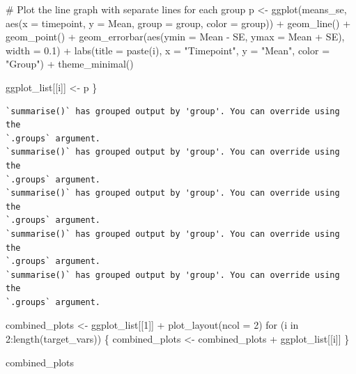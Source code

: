 \documentclass[
  letterpaper,
  DIV=11,
  numbers=noendperiod]{scrreprt}
\newenvironment{Shaded}{\begin{snugshade}}{\end{snugshade}}
\newcommand{\AttributeTok}[1]{\textcolor[rgb]{0.40,0.45,0.13}{#1}}
\newcommand{\CommentTok}[1]{\textcolor[rgb]{0.37,0.37,0.37}{#1}}
\newcommand{\ControlFlowTok}[1]{\textcolor[rgb]{0.00,0.23,0.31}{#1}}
\newcommand{\DecValTok}[1]{\textcolor[rgb]{0.68,0.00,0.00}{#1}}
\newcommand{\FloatTok}[1]{\textcolor[rgb]{0.68,0.00,0.00}{#1}}
\newcommand{\FunctionTok}[1]{\textcolor[rgb]{0.28,0.35,0.67}{#1}}
\newcommand{\NormalTok}[1]{\textcolor[rgb]{0.00,0.23,0.31}{#1}}
\newcommand{\OtherTok}[1]{\textcolor[rgb]{0.00,0.23,0.31}{#1}}
\newcommand{\SpecialCharTok}[1]{\textcolor[rgb]{0.37,0.37,0.37}{#1}}
\newcommand{\StringTok}[1]{\textcolor[rgb]{0.13,0.47,0.30}{#1}}
\begin{document}
\begin{Shaded}
\begin{Highlighting}[]
  \CommentTok{\# Plot the line graph with separate lines for each group}
\NormalTok{  p }\OtherTok{\textless{}{-}} \FunctionTok{ggplot}\NormalTok{(means\_se, }\FunctionTok{aes}\NormalTok{(}\AttributeTok{x =}\NormalTok{ timepoint, }\AttributeTok{y =}\NormalTok{ Mean, }\AttributeTok{group =}\NormalTok{ group, }\AttributeTok{color =}\NormalTok{ group)) }\SpecialCharTok{+}
    \FunctionTok{geom\_line}\NormalTok{() }\SpecialCharTok{+}
    \FunctionTok{geom\_point}\NormalTok{() }\SpecialCharTok{+}
    \FunctionTok{geom\_errorbar}\NormalTok{(}\FunctionTok{aes}\NormalTok{(}\AttributeTok{ymin =}\NormalTok{ Mean }\SpecialCharTok{{-}}\NormalTok{ SE, }\AttributeTok{ymax =}\NormalTok{ Mean }\SpecialCharTok{+}\NormalTok{ SE), }\AttributeTok{width =} \FloatTok{0.1}\NormalTok{) }\SpecialCharTok{+}
    \FunctionTok{labs}\NormalTok{(}\AttributeTok{title =} \FunctionTok{paste}\NormalTok{(i), }\AttributeTok{x =} \StringTok{"Timepoint"}\NormalTok{, }\AttributeTok{y =} \StringTok{"Mean"}\NormalTok{, }\AttributeTok{color =} \StringTok{"Group"}\NormalTok{) }\SpecialCharTok{+}
    \FunctionTok{theme\_minimal}\NormalTok{()}
  
\NormalTok{  ggplot\_list[[i]] }\OtherTok{\textless{}{-}}\NormalTok{ p}
\NormalTok{\}}
\end{Highlighting}
\end{Shaded}

\begin{verbatim}
`summarise()` has grouped output by 'group'. You can override using the
`.groups` argument.
`summarise()` has grouped output by 'group'. You can override using the
`.groups` argument.
`summarise()` has grouped output by 'group'. You can override using the
`.groups` argument.
`summarise()` has grouped output by 'group'. You can override using the
`.groups` argument.
`summarise()` has grouped output by 'group'. You can override using the
`.groups` argument.
\end{verbatim}

\begin{Shaded}
\begin{Highlighting}[]
\NormalTok{combined\_plots }\OtherTok{\textless{}{-}}\NormalTok{ ggplot\_list[[}\DecValTok{1}\NormalTok{]] }\SpecialCharTok{+} \FunctionTok{plot\_layout}\NormalTok{(}\AttributeTok{ncol =} \DecValTok{2}\NormalTok{)}
\ControlFlowTok{for}\NormalTok{ (i }\ControlFlowTok{in} \DecValTok{2}\SpecialCharTok{:}\FunctionTok{length}\NormalTok{(target\_vars)) \{}
\NormalTok{  combined\_plots }\OtherTok{\textless{}{-}}\NormalTok{ combined\_plots }\SpecialCharTok{+}\NormalTok{ ggplot\_list[[i]]}
\NormalTok{\}}

\NormalTok{combined\_plots}
\end{Highlighting}
\end{Shaded}
\end{document}
